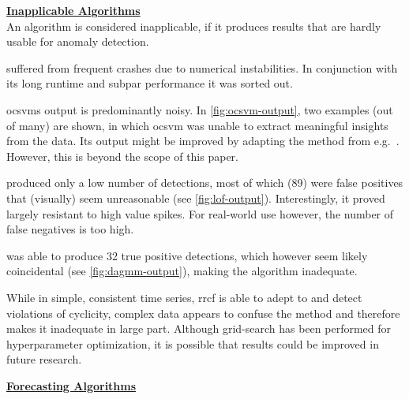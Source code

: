 \bigskip
{\large\uline{\textbf{Inapplicable Algorithms}}}\\
An algorithm is considered inapplicable, if it produces results that are hardly
usable for anomaly detection.
\begin{description}[style=unboxed,leftmargin=0cm]
    \item[TBAT/S] suffered from frequent crashes due to numerical instabilities.
    In conjunction with its long runtime and subpar performance it was sorted out.
    \item[OCSVM] \gls{ocsvm}s output is predominantly noisy. In \cref{fig:ocsvm-output},
    two examples (out of many) are shown, in which \gls{ocsvm} was unable to extract
    meaningful insights from the data. Its output might be improved by adapting
    the method from e.g.\ \textcite{GomezVerdejo.2011}. However, this is beyond
    the scope of this paper.
    \item[LOF] produced only a low number of detections, most of which
    (89) were false positives that (visually) seem unreasonable (see \cref{fig:lof-output}).
    Interestingly, it proved largely resistant to high value spikes.
    For real-world use however, the number of false negatives is too high.
    \item[DAGMM] was able to produce 32 true positive detections,
    which however seem likely coincidental (see \cref{fig:dagmm-output}), making
    the algorithm inadequate.
    \item[RRCF] While in simple, consistent time series, \gls{rrcf} is able to
    adept to and detect violations of cyclicity, complex data appears to confuse
    the method and therefore makes it inadequate in large part. Although grid-search
    has been performed for hyperparameter optimization, it is possible that
    results could be improved in future research.
\end{description}
\bigskip
{\large\uline{\textbf{Forecasting Algorithms}}}\\
